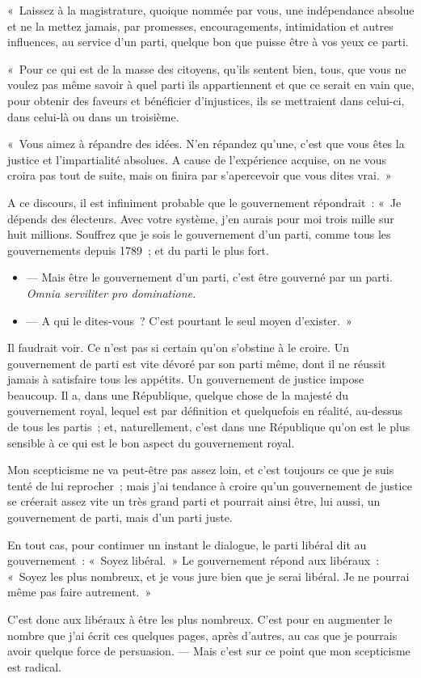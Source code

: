 \documentclass[french,twoside]{book} %
\begin{document}
« Laissez à la magistrature, quoique nommée par vous, une indépendance absolue et ne la mettez jamais, par promesses, encouragements, intimidation et autres influences, au service d’un parti, quelque bon que puisse être à vos yeux ce parti.\par
« Pour ce qui est de la masse des citoyens, qu’ils sentent bien, tous, que vous ne voulez pas même savoir à quel parti ils appartiennent et que ce serait en vain que, pour obtenir des faveurs et bénéficier d’injustices, ils se mettraient dans celui-ci, dans celui-là ou dans un troisième.\par
« Vous aimez à répandre des idées. N’en répandez qu’une, c’est que vous êtes la justice et l’impartialité absolues. A cause de l’expérience acquise, on ne vous croira pas tout de suite, mais on finira par s’apercevoir que vous dites vrai. »\par
A ce discours, il est infiniment probable que le gouvernement répondrait : « Je dépends des électeurs. Avec votre système, j’en aurais pour moi trois mille sur huit millions. Souffrez que je sois le gouvernement d’un parti, comme tous les  gouvernements depuis 1789 ; et du parti le plus fort.\par

\begin{itemize}[itemsep=0pt,]
\item  — Mais être le gouvernement d’un parti, c’est être gouverné par un parti. {\itshape Omnia serviliter pro dominatione.}
\item  — A qui le dites-vous ? C’est pourtant le seul moyen d’exister. »
\end{itemize}

\noindent Il faudrait voir. Ce n’est pas si certain qu’on s’obstine à le croire. Un gouvernement de parti est vite dévoré par son parti même, dont il ne réussit jamais à satisfaire tous les appétits. Un gouvernement de justice impose beaucoup. Il a, dans une République, quelque chose de la majesté du gouvernement royal, lequel est par définition et quelquefois en réalité, au-dessus de tous les partis ; et, naturellement, c’est dans une République qu’on est le plus sensible à ce qui est le bon aspect du gouvernement royal.\par
Mon scepticisme ne va peut-être pas assez loin, et c’est toujours ce que je suis tenté de lui reprocher ; mais j’ai tendance à croire qu’un gouvernement de justice se créerait assez vite un très grand parti et pourrait ainsi être, lui aussi, un gouvernement de parti, mais d’un parti juste.\par
En tout cas, pour continuer un instant le dialogue, le parti libéral dit au gouvernement : « Soyez libéral. » Le gouvernement répond aux  libéraux : « Soyez les plus nombreux, et je vous jure bien que je serai libéral. Je ne pourrai même pas faire autrement. »\par
C’est donc aux libéraux à être les plus nombreux. C’est pour en augmenter le nombre que j’ai écrit ces quelques pages, après d’autres, au cas que je pourrais avoir quelque force de persuasion. — Mais c’est sur ce point que mon scepticisme est radical.\par
\end{document}
